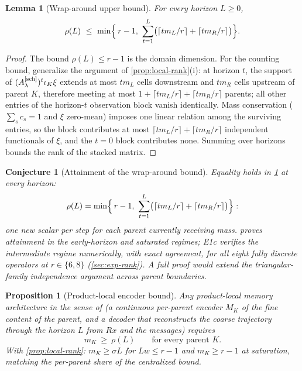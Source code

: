 \documentclass[pdflatex,sn-mathphys-num]{sn-jnl}%
\theoremstyle{thmstyleone}%
\newtheorem{lemma}{Lemma}%
\newtheorem{proposition}{Proposition}%
\newtheorem{conjecture}{Conjecture}%
\theoremstyle{thmstyletwo}%
\theoremstyle{thmstylethree}%
\newcommand{\Asch}{A^{[\rm sch]}_\lambda}
\begin{document}
\begin{lemma}[Wrap-around upper bound]\label{lem:local-upper}
For every horizon $L\ge0$, \[ \rho(L) \ \le\ \min\Bigl\{\,r-1,\ \sum_{t=1}^{L} \bigl(\lceil tm_L/r\rceil+\lceil tm_R/r\rceil\bigr)\Bigr\}. \]
\end{lemma}

\begin{proof}
The bound $\rho(L)\le r-1$ is the domain dimension.
For the counting bound, generalize the argument of \cref{prop:local-rank}(i): at horizon $t$, the support of $(\Asch)^t\iota_K\xi$ extends at most $tm_L$ cells downstream and $tm_R$ cells upstream of parent $K$, therefore meeting at most $1+\lceil tm_L/r\rceil+\lceil tm_R/r\rceil$ parents; all other entries of the horizon-$t$ observation block vanish identically.
Mass conservation ($\sum_sc_s=1$ and $\xi$ zero-mean) imposes one linear relation among the surviving entries, so the block contributes at most $\lceil tm_L/r\rceil+\lceil tm_R/r\rceil$ independent functionals of $\xi$, and the $t=0$ block contributes none.
Summing over horizons bounds the rank of the stacked matrix.
\end{proof}

\begin{conjecture}[Attainment of the wrap-around bound]\label{conj:local-rank}
Equality holds in \cref{lem:local-upper} at every horizon: \[ \rho(L) = \min\Bigl\{\,r-1,\ \sum_{t=1}^{L} \bigl(\lceil tm_L/r\rceil+\lceil tm_R/r\rceil\bigr)\Bigr\}: \] one new scalar per step for each parent currently receiving mass.
 proves attainment in the early-horizon and saturated regimes; E1c verifies the intermediate regime numerically, with exact agreement, for all eight fully discrete operators at $r\in\{6,8\}$ (\cref{sec:exp-rank}).
A full proof would extend the triangular-family independence argument across parent boundaries.
\end{conjecture}

\begin{proposition}[Product-local encoder bound]\label{prop:local-encoder}
Any product-local memory architecture in the sense of \cite{PolemitisChristakisDrikakis2026FVerasure} (a continuous per-parent encoder $M_K$ of the fine content of the parent, and a decoder that reconstructs the coarse trajectory through the horizon $L$ from $Rx$ and the messages) requires \[ m_K\ \ge\ \rho(L) \qquad\text{for every parent } K .\]
With \cref{prop:local-rank}: $m_K\ge\sigma L$ for $Lw\le r-1$ and $m_K\ge r-1$ at saturation, matching the per-parent share of the centralized bound.
\end{proposition}
\end{document}
